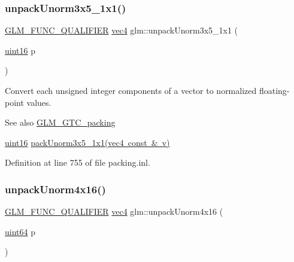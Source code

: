 \mbox{\label{group__gtc__packing_gaab3b476e8f320670717fd518f350ce28}} 
\subsubsection{\texorpdfstring{unpackUnorm3x5\_1x1()}{unpackUnorm3x5\_1x1()}}
{\footnotesize\ttfamily \mbox{\hyperlink{setup_8hpp_a33fdea6f91c5f834105f7415e2a64407}{G\+L\+M\+\_\+\+F\+U\+N\+C\+\_\+\+Q\+U\+A\+L\+I\+F\+I\+ER}} \mbox{\hyperlink{group__core__types_ga5881b1b022d7fd1b7218f5916532dd02}{vec4}} glm\+::unpack\+Unorm3x5\+\_\+1x1 (\begin{DoxyParamCaption}\item[{\mbox{\hyperlink{group__gtc__type__precision_gad8c2939e1fdd8e5828b31d95c52255d5}{uint16}}}]{p }\end{DoxyParamCaption})}

Convert each unsigned integer components of a vector to normalized floating-\/point values.

\begin{DoxySeeAlso}{See also}
\mbox{\hyperlink{group__gtc__packing}{G\+L\+M\+\_\+\+G\+T\+C\+\_\+packing}} 

\mbox{\hyperlink{group__gtc__type__precision_gad8c2939e1fdd8e5828b31d95c52255d5}{uint16}} \mbox{\hyperlink{group__gtc__packing_ga1b41375846ed66768da78ca299d8d010}{pack\+Unorm3x5\+\_\+1x1(vec4 const \& v)}} 
\end{DoxySeeAlso}


Definition at line 755 of file packing.\+inl.

\mbox{\label{group__gtc__packing_gafb2b502bc406031a5618ce930139a9e3}} 
\subsubsection{\texorpdfstring{unpackUnorm4x16()}{unpackUnorm4x16()}}
{\footnotesize\ttfamily \mbox{\hyperlink{setup_8hpp_a33fdea6f91c5f834105f7415e2a64407}{G\+L\+M\+\_\+\+F\+U\+N\+C\+\_\+\+Q\+U\+A\+L\+I\+F\+I\+ER}} \mbox{\hyperlink{group__core__types_ga5881b1b022d7fd1b7218f5916532dd02}{vec4}} glm\+::unpack\+Unorm4x16 (\begin{DoxyParamCaption}\item[{\mbox{\hyperlink{group__gtc__type__precision_gae3632bf9b37da66233d78930dd06378a}{uint64}}}]{p }\end{DoxyParamCaption})}

